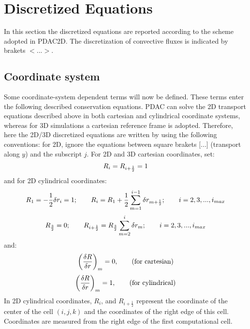 \section{Discretized Equations \label{ch:FV}}
In this section the discretized equations are reported according to the scheme adopted
in PDAC2D. The discretization of convective fluxes is indicated by brakets
$<...>$. 

\subsection{Coordinate system}
Some coordinate-system dependent terms will now be defined.
These terms enter the following described conservation equations.
PDAC can solve the 2D transport equations described above in both cartesian
and cylindrical coordinate systems, whereas for 3D simulations a cartesian
reference frame is adopted. Therefore, here the 2D/3D discretized equations
are written by using the following conventions: for 2D, ignore the equations
between square brakets $\Bigg[...\Bigg]$ (transport along $y$) and the subscript $j$.
For 2D and 3D cartesian coordinates, set:
%
\begin{eqnarray}
\htmlimage{}
R_{i} =  R_{i+\frac{1}{2}} = 1
\nonumber
\end{eqnarray}
%
and for 2D cylindrical coordinates:
%
\begin{eqnarray}
\htmlimage{}
R_{1} =  -\frac{1}{2} \delta r_{i} = 1;
\qquad R_{i} =  R_{1}+\frac{1}{2} \sum_{m=1}^{i-1}
\delta r_{m+\frac{1}{2}};\qquad i=2,3,...,i_{max}
\nonumber
\end{eqnarray}
%
\begin{eqnarray}
\htmlimage{}
R_{\frac{3}{2}} =  0; \qquad R_{i+\frac{1}{2}} =  R_{\frac{3}{2}} \sum_{m=2}^{i}
\delta r_{m}; \qquad i = 2,3,...,i_{max}
\nonumber
\end{eqnarray}
%
and:
%
\begin{eqnarray}
\htmlimage{}
\bigg(\frac{\delta R}{\delta r}\bigg)_m  =  0, \qquad \mbox{\rm (for cartesian)}
\nonumber
\end{eqnarray}
%
\begin{eqnarray}
\htmlimage{}
\bigg(\frac{\delta R}{\delta r}\bigg)_m  =  1, \qquad \mbox{\rm (for cylindrical)}
\nonumber
\end{eqnarray}
%
In 2D cylindrical coordinates, $R_{i}$, and $R_{i+\frac{1}{2}}$ represent the coordinate
of the center of the cell $(i,j,k)$ and the coordinates of the right edge of this cell.
Coordinates are measured from the right edge of the first computational cell.\\



